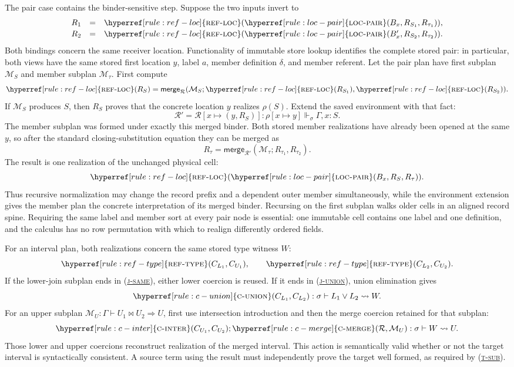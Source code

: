 \documentclass[acmsmall,screen,nonacm]{acmart}
\newcommand{\ruleuse}[1]{%
  \hyperref[rule:#1]{\textsc{#1}}}
\newcommand{\ruleref}[1]{%
  \textsc{(\hyperref[rule:#1]{#1})}}
\newcommand{\unionty}[2]{#1\mathbin{\vee}#2}
\newcommand{\mergeop}{\mathbin{\bowtie}}
\newcommand{\realizes}{\Vdash}
\newcommand{\coerce}{\mathrel{\rightsquigarrow}}
\begin{document}
The pair case contains the binder-sensitive step. Suppose the two inputs
invert to
\[
\begin{array}{rcl}
  R_1&=&\ruleuse{ref-loc}
    (\ruleuse{loc-pair}(B_x,R_{S_1},R_{\tau_1})),\\[2pt]
  R_2&=&\ruleuse{ref-loc}
    (\ruleuse{loc-pair}(B_x',R_{S_2},R_{\tau_2})).
\end{array}
\]
Both bindings concern the same receiver location. Functionality of immutable
store lookup identifies the complete stored pair: in particular, both views
have the same stored first location \(y\), label \(a\), member definition
\(\delta\), and member referent. Let the pair plan have first subplan
\(\mathcal M_S\) and member subplan \(\mathcal M_\tau\). First compute
\[
  \ruleuse{ref-loc}(R_S)
  =\mathsf{merge}_{\mathcal R}
     (\mathcal M_S;
       \ruleuse{ref-loc}(R_{S_1}),
       \ruleuse{ref-loc}(R_{S_2})).
\]
If \(\mathcal M_S\) produces \(S\), then \(R_S\) proves that the concrete
location \(y\) realizes \(\rho(S)\). Extend the saved environment with that
fact:
\[
  \mathcal R'=\mathcal R[x\mapsto(y,R_S)]
  :\rho[x\mapsto y]\realizes_\sigma\Gamma,x:S.
\]
The member subplan was formed under exactly this merged binder. Both stored
member realizations have already been opened at the same \(y\), so after the
standard closing-substitution equation they can be merged as
\[
  R_\tau=
  \mathsf{merge}_{\mathcal R'}
    (\mathcal M_\tau;R_{\tau_1},R_{\tau_2}).
\]
The result is one realization of the unchanged physical cell:
\[
  \ruleuse{ref-loc}
    (\ruleuse{loc-pair}(B_x,R_S,R_\tau)).
\]
Thus recursive normalization may change the record prefix and a dependent
outer member simultaneously, while the environment extension gives the
member plan the concrete interpretation of its merged binder. Recursing on
the first subplan walks older cells in an aligned record spine. Requiring the
same label and member sort at every pair node is essential: one immutable
cell contains one label and one definition, and the calculus has no row
permutation with which to realign differently ordered fields.

For an interval plan, both realizations concern the same stored type witness
\(W\):
\[
  \ruleuse{ref-type}(C_{L_1},C_{U_1}),
  \qquad
  \ruleuse{ref-type}(C_{L_2},C_{U_2}).
\]
If the lower-join subplan ends in \ruleref{j-same}, either lower coercion is
reused. If it ends in \ruleref{j-union}, union elimination gives
\[
  \ruleuse{c-union}(C_{L_1},C_{L_2}):
  \sigma\vdash\unionty{L_1}{L_2}\coerce W.
\]
For an upper subplan
\(\mathcal M_U:\Gamma\vdash U_1\mergeop U_2\Longrightarrow U\), first use
intersection introduction and then the merge coercion retained for that
subplan:
\[
  \ruleuse{c-inter}(C_{U_1},C_{U_2});
  \ruleuse{c-merge}(\mathcal R,\mathcal M_U)
  :\sigma\vdash W\coerce U.
\]
Those lower and upper coercions reconstruct realization of the merged
interval. This action is semantically valid whether or not the target
interval is syntactically consistent. A source term using the result must
independently prove the target well formed, as required by \ruleref{t-sub}.
\end{document}
